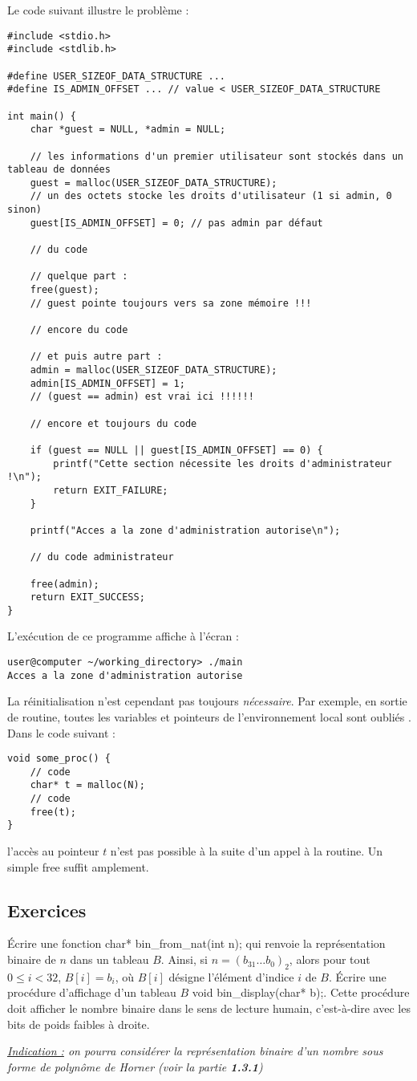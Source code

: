 \documentclass[../../../main.tex]{subfiles}
\begin{document}
Le code suivant illustre le problème :
\begin{verbatim}
#include <stdio.h>
#include <stdlib.h>

#define USER_SIZEOF_DATA_STRUCTURE ...
#define IS_ADMIN_OFFSET ... // value < USER_SIZEOF_DATA_STRUCTURE

int main() {
	char *guest = NULL, *admin = NULL;

	// les informations d'un premier utilisateur sont stockés dans un tableau de données
	guest = malloc(USER_SIZEOF_DATA_STRUCTURE);
	// un des octets stocke les droits d'utilisateur (1 si admin, 0 sinon)
	guest[IS_ADMIN_OFFSET] = 0; // pas admin par défaut

	// du code

	// quelque part :
	free(guest);
	// guest pointe toujours vers sa zone mémoire !!!

	// encore du code
	
	// et puis autre part :
	admin = malloc(USER_SIZEOF_DATA_STRUCTURE);
	admin[IS_ADMIN_OFFSET] = 1;
	// (guest == admin) est vrai ici !!!!!!

	// encore et toujours du code

	if (guest == NULL || guest[IS_ADMIN_OFFSET] == 0) {
		printf("Cette section nécessite les droits d'administrateur !\n");
		return EXIT_FAILURE;
	}
	
	printf("Acces a la zone d'administration autorise\n");

	// du code administrateur

	free(admin);
	return EXIT_SUCCESS;
}
\end{verbatim}
L'exécution de ce programme affiche à l'écran :
\begin{verbatim}
user@computer ~/working_directory> ./main
Acces a la zone d'administration autorise
\end{verbatim}
La réinitialisation n'est cependant pas toujours \textit{nécessaire}. Par exemple, en sortie de routine, toutes les variables et pointeurs de l'environnement local sont \og oubliés \fg. Dans le code suivant :
\begin{verbatim}
void some_proc() {
	// code
	char* t = malloc(N);
	// code
	free(t);
}
\end{verbatim}
l'accès au pointeur $t$ n'est pas possible à la suite d'un appel à la routine. Un simple \textsf{free} suffit amplement.
\subsection{Exercices}
Écrire une fonction \textsf{char* bin\_from\_nat(int n);} qui renvoie la représentation binaire de $n$ dans un tableau $B$. Ainsi, si $n = (b_{31}\dots b_{0})_2$, alors pour tout $0 \leq i < 32$, $B[i] = b_i$, où $B[i]$ désigne l'élément d'indice $i$ de $B$. Écrire une procédure d'affichage d'un tableau $B$ \textsf{void bin\_display(char* b);}. Cette procédure doit afficher le nombre binaire dans le sens de lecture humain, c'est-à-dire avec les bits de poids faibles à droite.

\textit{\underline{Indication :} on pourra considérer la représentation binaire d'un nombre sous forme de polynôme de Horner (voir la partie \textbf{1.3.1})}
\end{document}
